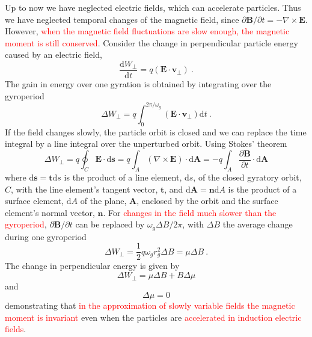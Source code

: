 \documentclass[12pt,a4paper]{article}
\renewcommand{\vec}[1]{\boldsymbol{#1}}
\newcommand{\dif}{\mathrm{d}}
\newcounter{theo}[section]\setcounter{theo}{0}
\begin{document}
Up to now we have neglected electric fields, which can accelerate particles. Thus we have neglected temporal changes of the magnetic field, since $\partial \vec{B}/\partial t = -\nabla \times \vec{E}$. However, \textcolor{red}{when the magnetic field fluctuations are slow enough, the magnetic moment is still conserved}. Consider the change in perpendicular particle energy caused by an electric field, 
\begin{equation}
\dfrac{\dif W_\perp}{\dif t} = q(\vec{E} \cdot \vec{v}_\perp) ~.
\end{equation}
The gain in energy over one gyration is obtained by integrating over the gyroperiod
\begin{equation}
\Delta  W_\perp = q \int_0^{2\pi/\omega_g} (\vec{E} \cdot \vec{v}_\perp)  \dif t ~.
\end{equation}
If the field changes slowly, the particle orbit is closed and we can replace the time integral by a line integral over the unperturbed orbit. Using Stokes' theorem
\begin{equation}
\Delta  W_\perp = q \oint_C \vec{E} \cdot \dif \vec{s} = q \int_A (\nabla \times \vec{E}) \cdot \dif \vec{A}  = -q \int_A \dfrac{\partial \vec{B}}{\partial t} \cdot \dif \vec{A} 
\end{equation}
where $\dif \vec{s} = \vec{t} \dif s$ is the product of a line element, $\dif s$, of the closed gyratory orbit, $C$, with the line element's tangent vector, $\vec{t}$, and $\dif \vec{A} = \vec{n} \dif A$ is the product of a surface element, $\dif A$ of the plane, $\vec{A}$, enclosed by the orbit and the surface element's normal vector, $\vec{n}$. For  \textcolor{red}{changes in the field much slower than the gyroperiod}, $\partial \vec{B}/\partial t$ can be replaced by $\omega_g \Delta B/2\pi$, with $\Delta B$ the average change during one gyroperiod
\begin{equation}
\Delta  W_\perp = \dfrac{1}{2} q \omega_g r^2_g \Delta B = \mu \Delta B ~.
\end{equation}
The change in perpendicular energy is given by
\begin{equation}
\Delta  W_\perp = \mu \Delta B + B \Delta \mu
\end{equation}
and
\begin{equation}
\Delta \mu = 0
\end{equation}
demonstrating that  \textcolor{red}{in the approximation of slowly variable fields the magnetic moment is invariant} even when the particles are \textcolor{red}{accelerated in induction electric fields}.
\end{document}

